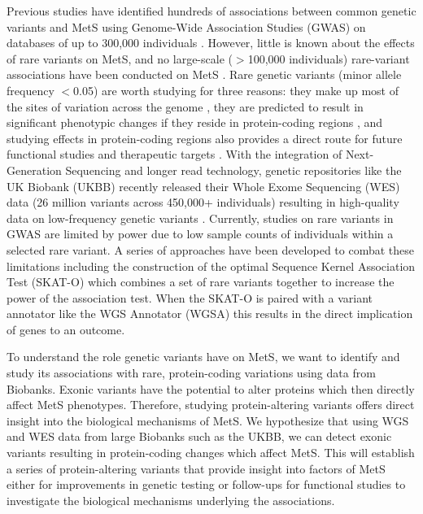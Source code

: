 \documentclass[11pt]{article}
\begin{document}
Previous studies have identified hundreds of associations between common genetic variants and MetS using Genome-Wide Association Studies (GWAS) on databases of up to 300,000 individuals \cite{pmid31589552}. However, little is known about the effects of rare variants on MetS, and no large-scale ($>$100,000 individuals) rare-variant associations have been conducted on MetS \cite{Lee2018}. Rare genetic variants (minor allele frequency $<$0.05) are worth studying for three reasons: they make up most of the sites of variation across the genome \cite{pmid34662886}, they are predicted to result in significant phenotypic changes if they reside in protein-coding regions \cite{pmid34662886}, and studying effects in protein-coding regions also provides a direct route for future functional studies and therapeutic targets \cite{doi:10.1056/NEJMoa2117872}. With the integration of Next-Generation Sequencing and longer read technology, genetic repositories like the UK Biobank (UKBB) recently released their Whole Exome Sequencing  (WES) data (26 million variants across 450,000+ individuals) resulting in high-quality data on low-frequency genetic variants \cite{pmid34662886}. Currently, studies on rare variants in GWAS are limited by power due to low sample counts of individuals within a selected rare variant. A series of approaches have been developed to combat these limitations including the construction of the optimal Sequence Kernel Association Test (SKAT-O) \cite{pmid22863193} which combines a set of rare variants together to increase the power of the association test. When the SKAT-O is paired with a variant annotator like the WGS Annotator (WGSA) \cite{pmid26395054} this results in the direct implication of genes to an outcome.

To understand the role genetic variants have on MetS, we want to identify and study its associations with rare, protein-coding variations using data from Biobanks. Exonic variants have the potential to alter proteins which then directly affect MetS phenotypes. Therefore, studying protein-altering variants offers direct insight into the biological mechanisms of MetS. We hypothesize that using WGS and WES data from large Biobanks such as the UKBB, we can detect exonic variants resulting in protein-coding changes which affect MetS. This will establish a series of protein-altering variants that provide insight into factors of MetS either for improvements in genetic testing or follow-ups for functional studies to investigate the biological mechanisms underlying the associations.
\end{document}
